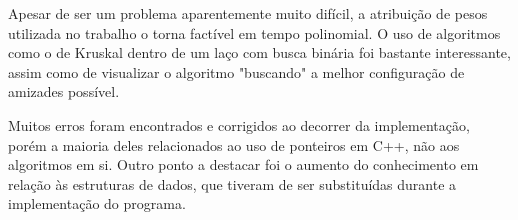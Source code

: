 \documentclass[a4paper,12pt,titlepage]{article}
\begin{document}
Apesar de ser um problema aparentemente muito difícil, a atribuição de pesos utilizada no trabalho o torna factível em tempo polinomial. O uso de algoritmos como o de Kruskal dentro de um laço com busca binária foi bastante interessante, assim como de visualizar o algoritmo "buscando" a melhor configuração de amizades possível.

Muitos erros foram encontrados e corrigidos ao decorrer da implementação, porém a maioria deles relacionados ao uso de ponteiros em C++, não aos algoritmos em si. Outro ponto a destacar foi o aumento do conhecimento em relação às estruturas de dados, que tiveram de ser substituídas durante a implementação do programa.

\cite{cormen} 


\newpage
\end{document}
